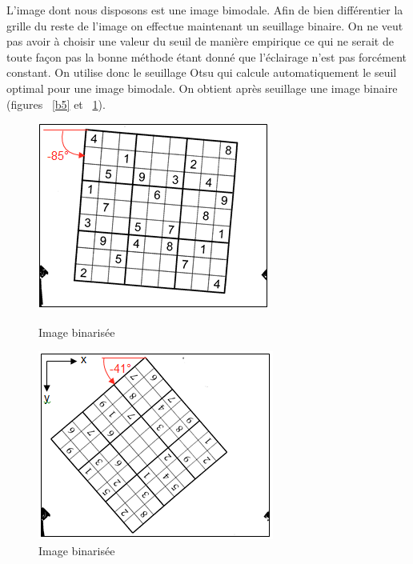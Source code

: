 \documentclass[12pt]{article}
\begin{document}
\noindent
L'image dont nous disposons est une image bimodale. Afin de bien différentier la grille du reste de l'image on effectue maintenant un seuillage binaire. On ne veut pas avoir à choisir une valeur du seuil de manière empirique ce qui ne serait de toute façon pas la bonne méthode étant donné que l'éclairage n'est pas forcément constant. On utilise donc le seuillage Otsu qui calcule automatiquement le seuil optimal pour une image bimodale. On obtient après seuillage une image binaire  (figures ~\ref{b5} et ~\ref{b6}).
\begin{figure}[!h]
\centering
\begin{minipage}{.5\textwidth}
  \centering
  \includegraphics[scale = 0.7]{b3.png}
  \caption{\label{b5} Image binarisée}
\end{minipage}%
\begin{minipage}{.5\textwidth}
  \centering
  \includegraphics[scale = 0.7]{b4.png}
  \caption{\label{b6} Image binarisée}
\end{minipage}
\end{figure}\\
\vspace*{0.5cm}
\noindent
\end{document}
